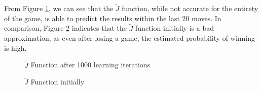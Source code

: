 \documentclass[11pt,twocolumn]{article}
\begin{document}
From Figure \ref{JFunctionGraphs_1000iterations}, we can see that the $\tilde{J}$ function, while not accurate for the entirety of the game, is able to predict the results within the last 20 moves. In comparison, Figure \ref{JFunctionGraphs_1iteration} indicates that the $\tilde{J}$ function initially is a bad approximation, as even after losing a game, the estimated probability of winning is high.
\begin{figure}[H]\centering

    \caption{$\tilde{J}$ Function after 1000 learning iterations}
    \label{JFunctionGraphs_1000iterations}
\end{figure}
\begin{figure}[H]\centering

    \caption{$\tilde{J}$ Function initially}
    \label{JFunctionGraphs_1iteration}
\end{figure}
\end{document}
